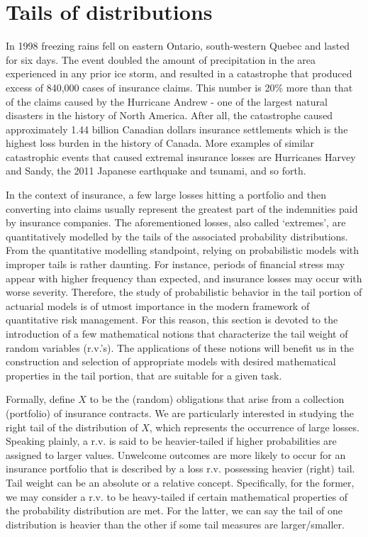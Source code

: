\documentclass[12pt]{article}
\begin{document}

\section{Tails of distributions}
In 1998 freezing rains fell on eastern Ontario, south-western Quebec and lasted for six days. The event doubled the amount of precipitation in the area experienced in any prior ice storm, and resulted in a catastrophe that produced excess of 840,000 cases of insurance claims. This number is 20\% more than that of the claims caused by the Hurricane Andrew - one of the largest natural disasters in the history of North America. After all, the catastrophe caused approximately 1.44 billion Canadian dollars insurance settlements which is the highest loss burden in the history of Canada. %
More examples of similar catastrophic events that caused extremal insurance losses are Hurricanes Harvey and Sandy, the 2011 Japanese earthquake and tsunami, and so forth.

In the context of insurance, a few large losses hitting a portfolio and then converting into claims usually represent the greatest part of the indemnities paid by insurance companies. The aforementioned losses, also called `extremes', are quantitatively modelled by the tails of the associated probability distributions.  From the quantitative modelling standpoint, relying on probabilistic models with improper tails is rather daunting.  For instance, periods of financial stress may appear with higher frequency than expected, and insurance losses may occur with worse severity. Therefore, the study of probabilistic behavior in the tail portion of actuarial models is of utmost importance in the modern framework of quantitative risk management. For this reason, this section is devoted to the introduction of a few mathematical notions that characterize the tail weight of random variables (r.v.'s). The applications of these notions will benefit us in the construction and selection of appropriate models with desired mathematical properties in the tail portion, that are suitable for a given task.

Formally, define $X$ to be the (random) obligations that arise from a collection (portfolio) of insurance contracts.  We are particularly interested in studying the right tail of the distribution of $X$, which represents the occurrence of large losses. Speaking plainly, a r.v. is said to be heavier-tailed if higher probabilities are assigned to larger values.  Unwelcome outcomes are more likely to occur for an insurance portfolio that is described by a loss r.v. possessing heavier (right) tail.  Tail weight can be an absolute or a relative concept.  Specifically, for the former, we may consider a r.v. to be heavy-tailed if certain mathematical properties of the probability distribution are met.  For the latter, we can say the tail of one distribution is heavier than the other if some tail measures are larger/smaller.
\end{document}
